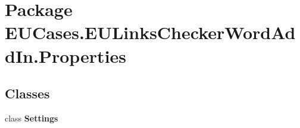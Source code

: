 \hypertarget{namespace_e_u_cases_1_1_e_u_links_checker_word_add_in_1_1_properties}{\section{Package E\+U\+Cases.\+E\+U\+Links\+Checker\+Word\+Add\+In.\+Properties}
\label{namespace_e_u_cases_1_1_e_u_links_checker_word_add_in_1_1_properties}
}
\subsection*{Classes}
\begin{DoxyCompactItemize}
\item 
class {\bfseries Settings}
\end{DoxyCompactItemize}

